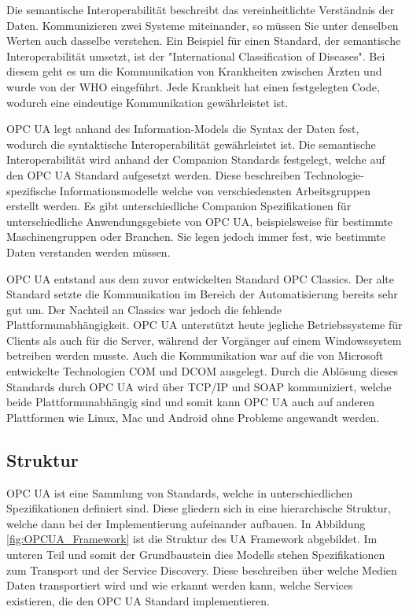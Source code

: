 \documentclass[a4paper, 12pt, oneside, toc=listofnumbered, bibliography=totoc]{scrbook}
\begin{document}
	 Die semantische Interoperabilität beschreibt das vereinheitlichte Verständnis der Daten. Kommunizieren zwei Systeme miteinander, so müssen Sie unter denselben Werten auch dasselbe verstehen. Ein Beispiel für einen Standard, der semantische Interoperabilität umsetzt, ist der "International Classification of Diseases". Bei diesem geht es um die Kommunikation von Krankheiten zwischen Ärzten und wurde von der WHO eingeführt. Jede Krankheit hat einen festgelegten Code, wodurch eine eindeutige Kommunikation gewährleistet ist. \cite{mielebacher_verteilte_2021-1}
	 
	 OPC UA legt anhand des Information-Models die Syntax der Daten fest, wodurch die syntaktische Interoperabilität gewährleistet ist. Die semantische Interoperabilität wird anhand der Companion Standards festgelegt, welche auf den OPC UA Standard aufgesetzt werden. Diese beschreiben Technologie-spezifische Informationsmodelle welche von verschiedensten Arbeitsgruppen erstellt werden. Es gibt unterschiedliche Companion Spezifikationen für unterschiedliche Anwendungsgebiete von OPC UA, beispielsweise für bestimmte Maschinengruppen oder Branchen. Sie legen jedoch immer fest, wie bestimmte Daten verstanden werden müssen. %
	 
	 OPC UA entstand aus dem zuvor entwickelten Standard OPC Classics. Der alte Standard setzte die Kommunikation im Bereich der Automatisierung bereits sehr gut um. Der Nachteil an Classics war jedoch die fehlende Plattformunabhängigkeit. OPC UA unterstützt heute jegliche Betriebssysteme für Clients als auch für die Server, während der Vorgänger auf einem Windowssystem betreiben werden musste. Auch die Kommunikation war auf die von Microsoft entwickelte Technologien \ac{COM} und \ac{DCOM} ausgelegt. Durch die Ablösung dieses Standards durch OPC UA wird über TCP/IP und SOAP kommuniziert, welche beide Plattformunabhängig sind und somit kann OPC UA auch auf anderen Plattformen wie Linux, Mac und Android ohne Probleme angewandt werden. \cite{mielebacher_verteilte_2021-1}
	
		\subsection{Struktur}
		
		OPC UA ist eine Sammlung von Standards, welche in unterschiedlichen Spezifikationen definiert sind. Diese gliedern sich in eine hierarchische Struktur, welche dann bei der Implementierung aufeinander aufbauen. In Abbildung \ref{fig:OPCUA_Framework} ist die Struktur des UA Framework abgebildet. Im unteren Teil und somit der Grundbaustein dies Modells stehen Spezifikationen zum Transport und der Service Discovery. Diese beschreiben über welche Medien Daten transportiert wird und wie erkannt werden kann, welche Services existieren, die den OPC UA Standard implementieren. \cite{mahnke_opc_2009, rinke_was_2022}
		
\end{document}
